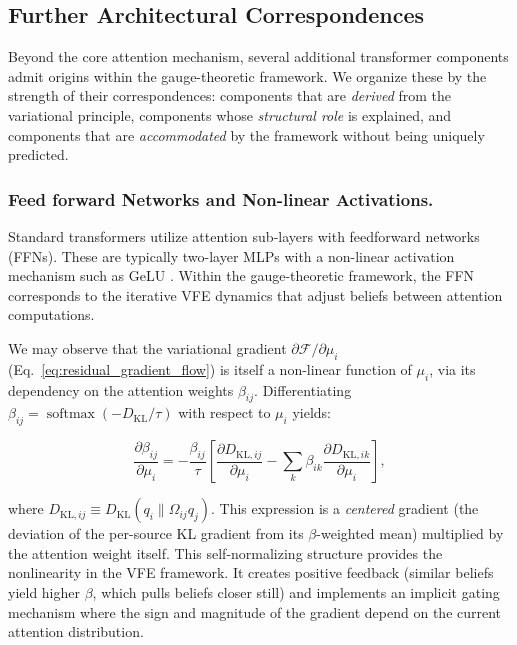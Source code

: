 \documentclass[twoside,11pt]{article}
\begin{document}
\subsection{Further Architectural Correspondences}
\label{sec:further_correspondences}

Beyond the core attention mechanism, several additional transformer components admit origins within the gauge-theoretic framework. We organize these by the strength of their correspondences: components that are \emph{derived} from the variational principle, components whose \emph{structural role} is explained, and components that are \emph{accommodated} by the framework without being uniquely predicted.

\subsubsection{Feed forward Networks and Non-linear Activations.}
\label{sec:ffn_nonlinearity}

Standard transformers utilize attention sub-layers with feedforward networks (FFNs). These are typically two-layer MLPs with a non-linear activation mechanism such as GeLU \citep{hendrycks2016gaussian}. Within the gauge-theoretic framework, the FFN corresponds to the iterative VFE dynamics that adjust beliefs between attention computations.

We may observe that the variational gradient $\partial \mathcal{F}/\partial \mu_i$ (Eq.~\ref{eq:residual_gradient_flow}) is itself a non-linear function of $\mu_i$, via its dependency on the attention weights $\beta_{ij}$. Differentiating $\beta_{ij} = \operatorname{softmax}(-D_{\mathrm{KL}}/\tau)$ with respect to $\mu_i$ yields:

\begin{equation}
\frac{\partial \beta_{ij}}{\partial \mu_i} = -\frac{\beta_{ij}}{\tau}\left[\frac{\partial D_{\mathrm{KL},ij}}{\partial \mu_i} - \sum_k \beta_{ik} \frac{\partial D_{\mathrm{KL},ik}}{\partial \mu_i}\right],
\label{eq:softmax_gradient_nonlinearity}
\end{equation}



where $D_{\mathrm{KL},ij} \equiv D_{\mathrm{KL}}(q_i \| \Omega_{ij} q_j)$. This expression is a \emph{centered} gradient (the deviation of the per-source KL gradient from its $\beta$-weighted mean) multiplied by the attention weight itself. This self-normalizing structure provides the nonlinearity in the VFE framework. It creates positive feedback (similar beliefs yield higher $\beta$, which pulls beliefs closer still) and implements an implicit gating mechanism where the sign and magnitude of the gradient depend on the current attention distribution.
\end{document}
